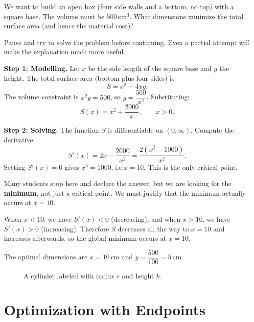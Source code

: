 \begin{example}
\label{ex:6-3}
We want to build an open box (four side walls and a bottom, no top) with a square base.  The volume must be $500\,\text{cm}^{3}$.  What dimensions minimize the total surface area (and hence the material cost)?
\end{example}

\begin{remark}
Pause and try to solve the problem before continuing.  Even a partial attempt will make the explanation much more useful.
\end{remark}

\textbf{Step 1: Modelling.}  Let $x$ be the side length of the square base and $y$ the height.  The total surface area (bottom plus four sides) is
\[
  S = x^{2} + 4xy.
\]
The volume constraint is $x^{2}y = 500$, so $y = \dfrac{500}{x^{2}}$.  Substituting:
\[
  S(x) = x^{2} + \frac{2000}{x}, \qquad x > 0.
\]

\textbf{Step 2: Solving.}  The function $S$ is differentiable on $(0,\infty)$.  Compute the derivative:
\[
  S'(x) = 2x - \frac{2000}{x^{2}} = \frac{2(x^{3} - 1000)}{x^{2}}.
\]
Setting $S'(x) = 0$ gives $x^{3} = 1000$, i.e.\@ $x = 10$.  This is the only critical point.

\begin{remark}[Warning]
Many students stop here and declare the answer, but we are looking for the \textbf{minimum}, not just a critical point.  We must justify that the minimum actually occurs at $x = 10$.
\end{remark}

When $x < 10$, we have $S'(x) < 0$ (decreasing), and when $x > 10$, we have $S'(x) > 0$ (increasing).  Therefore $S$ decreases all the way to $x = 10$ and increases afterwards, so the global minimum occurs at $x = 10$.

The optimal dimensions are $x = 10\,\text{cm}$ and $y = \dfrac{500}{100} = 5\,\text{cm}$.

\begin{figure}[ht]
  \centering
  
  \caption{A cylinder labeled with radius $r$ and height $h$.}
  \label{fig:optimization-cylinder}
\end{figure}

\section{Optimization with Endpoints}
\label{sec:6.4}

